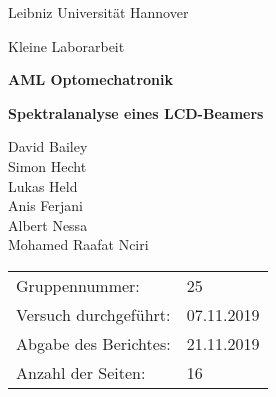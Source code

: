 \begin{titlepage}
	\centering
	{Leibniz Universität Hannover\par}
	{\large Kleine Laborarbeit\par}	

	\vspace{4.5cm}	
	
	{\huge \bf AML Optomechatronik \par}
	{\Huge \bf Spektralanalyse eines LCD-Beamers\par}
	\vspace{0.3cm}
	
	\vspace{1.5cm}
	
	{\Large David Bailey 	\\
			Simon Hecht		\\
			Lukas Held		\\
			Anis Ferjani	\\
			Albert Nessa	\\
			Mohamed Raafat Nciri \par}

	\vfill

	\raggedright

{\Large
\begin{tabular}{ll}
Gruppennummer:& 25 \\
Versuch durchgeführt:& 07.11.2019 \\
Abgabe des Berichtes:& 21.11.2019 \\
Anzahl der Seiten:& 16
\end{tabular}\par}

\end{titlepage}